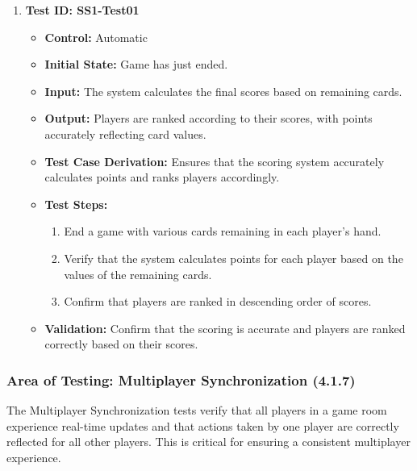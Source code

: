 \documentclass[12pt]{article}
\begin{document}
\begin{enumerate}
    \item \textbf{Test ID: SS1-Test01}
    \begin{itemize}
        \item \textbf{Control:} Automatic
        \item \textbf{Initial State:} Game has just ended.
        \item \textbf{Input:} The system calculates the final scores based on remaining cards.
        \item \textbf{Output:} Players are ranked according to their scores, with points accurately reflecting card values.
        \item \textbf{Test Case Derivation:} Ensures that the scoring system accurately calculates points and ranks players accordingly.
        \item \textbf{Test Steps:}
        \begin{enumerate}
            \item End a game with various cards remaining in each player’s hand.
            \item Verify that the system calculates points for each player based on the values of the remaining cards.
            \item Confirm that players are ranked in descending order of scores.
        \end{enumerate}
        \item \textbf{Validation:} Confirm that the scoring is accurate and players are ranked correctly based on their scores.
    \end{itemize}
\end{enumerate}

\subsubsection{Area of Testing: Multiplayer Synchronization (4.1.7)}

The Multiplayer Synchronization tests verify that all players in a game room experience real-time updates and that actions taken by one player are correctly reflected for all other players. This is critical for ensuring a consistent multiplayer experience.
\end{document}
